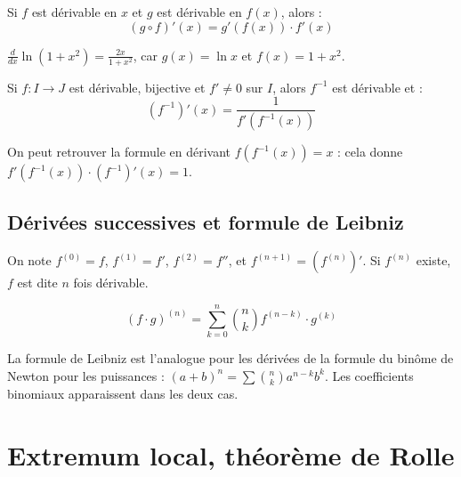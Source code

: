 \begin{propbox}
Si $f$ est dérivable en $x$ et $g$ est dérivable en $f(x)$, alors :
\[(g \circ f)'(x) = g'(f(x)) \cdot f'(x)\]
\end{propbox}

\begin{exbox}
$\frac{d}{dx}\ln(1 + x^2) = \frac{2x}{1 + x^2}$, car $g(x) = \ln x$ et $f(x) = 1 + x^2$.
\end{exbox}

\begin{corollaire}
Si $f : I \to J$ est dérivable, bijective et $f' \neq 0$ sur $I$, alors $f^{-1}$ est dérivable et :
\[(f^{-1})'(x) = \frac{1}{f'(f^{-1}(x))}\]
\end{corollaire}

\begin{rembox}
On peut retrouver la formule en dérivant $f(f^{-1}(x)) = x$ : cela donne $f'(f^{-1}(x)) \cdot (f^{-1})'(x) = 1$.
\end{rembox}

\subsection{Dérivées successives et formule de Leibniz}

\begin{defbox}
On note $f^{(0)} = f$, $f^{(1)} = f'$, $f^{(2)} = f''$, et $f^{(n+1)} = (f^{(n)})'$. Si $f^{(n)}$ existe, $f$ est dite $n$ fois dérivable.
\end{defbox}

\begin{thmbox}
\[(f \cdot g)^{(n)} = \sum_{k=0}^{n} \binom{n}{k} f^{(n-k)} \cdot g^{(k)}\]
\end{thmbox}

\begin{intuitionbox}
La formule de Leibniz est l'analogue pour les dérivées de la formule du binôme de Newton pour les puissances : $(a+b)^n = \sum \binom{n}{k} a^{n-k} b^k$. Les coefficients binomiaux apparaissent dans les deux cas.
\end{intuitionbox}


\section{Extremum local, théorème de Rolle}

